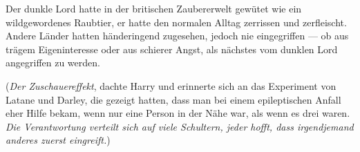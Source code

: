 Der dunkle Lord hatte in der britischen Zaubererwelt gewütet wie ein wildgewordenes Raubtier, er hatte den normalen Alltag zerrissen und zerfleischt. Andere Länder hatten händeringend zugesehen, jedoch nie eingegriffen — ob aus trägem Eigeninteresse oder aus schierer Angst, als nächstes vom dunklen Lord angegriffen zu werden.

(\emph{Der Zuschauereffekt}, dachte Harry und erinnerte sich an das Experiment von Latane und Darley, die gezeigt hatten, dass man bei einem epileptischen Anfall eher Hilfe bekam, wenn nur eine Person in der Nähe war, als wenn es drei waren. \emph{Die Verantwortung verteilt sich auf viele Schultern, jeder hofft, dass irgendjemand anderes zuerst eingreift.})%

